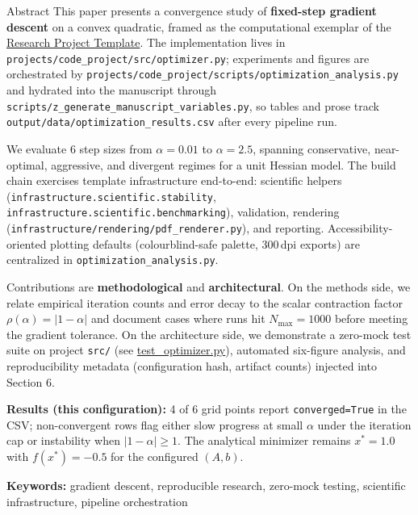 \documentclass[
  ignorenonframetext,
]{beamer}
\author{\texorpdfstring{}{}}
\date{}
\begin{document}
\begin{frame}[fragile]{Abstract}
\protect{}\label{abstract}
This paper presents a convergence study of \textbf{fixed-step gradient
descent} on a convex quadratic, framed as the computational exemplar of
the \href{https://github.com/docxology/template}{Research Project
Template}. The implementation lives in
\texttt{projects/code\_project/src/optimizer.py}; experiments and
figures are orchestrated by
\texttt{projects/code\_project/scripts/optimization\_analysis.py} and
hydrated into the manuscript through
\texttt{scripts/z\_generate\_manuscript\_variables.py}, so tables and
prose track \texttt{output/data/optimization\_results.csv} after every
pipeline run.

We evaluate 6 step sizes from \(\alpha = 0.01\) to \(\alpha = 2.5\),
spanning conservative, near-optimal, aggressive, and divergent regimes
for a unit Hessian model. The build chain exercises template
infrastructure end-to-end: scientific helpers
(\texttt{infrastructure.scientific.stability},
\texttt{infrastructure.scientific.benchmarking}), validation, rendering
(\texttt{infrastructure/rendering/pdf\_renderer.py}), and reporting.
Accessibility-oriented plotting defaults (colourblind-safe palette,
300\,dpi exports) are centralized in \texttt{optimization\_analysis.py}.

Contributions are \textbf{methodological} and \textbf{architectural}. On
the methods side, we relate empirical iteration counts and error decay
to the scalar contraction factor \(\rho(\alpha) = |1-\alpha|\) and
document cases where runs hit \(N_{\max} = 1000\) before meeting the
gradient tolerance. On the architecture side, we demonstrate a zero-mock
test suite on project \texttt{src/} (see
\href{https://github.com/docxology/template/blob/main/projects/code_project/tests/test_optimizer.py}{test\_optimizer.py}),
automated six-figure analysis, and reproducibility metadata
(configuration hash, artifact counts) injected into Section 6.

\textbf{Results (this configuration):} 4 of 6 grid points report
\texttt{converged=True} in the CSV; non-convergent rows flag either slow
progress at small \(\alpha\) under the iteration cap or instability when
\(|1-\alpha| \geq 1\). The analytical minimizer remains \(x^\ast = 1.0\)
with \(f(x^\ast) = -0.5\) for the configured \((A,b)\).

\textbf{Keywords:} gradient descent, reproducible research, zero-mock
testing, scientific infrastructure, pipeline orchestration
\end{frame}
\end{document}
